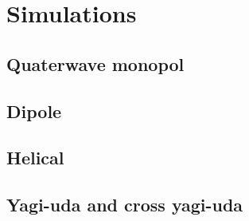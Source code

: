 \chapter{Simulations}

\section{Quaterwave monopol}
\section{Dipole}
\section{Helical}
\section{Yagi-uda and cross yagi-uda}
